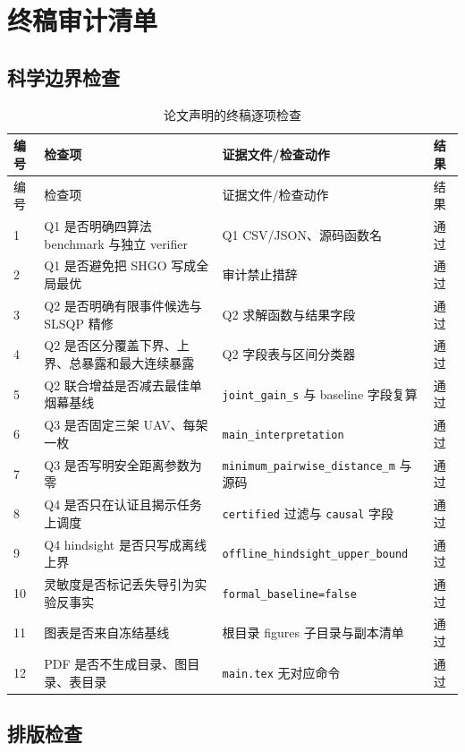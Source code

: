 \section{终稿审计清单}

\subsection{科学边界检查}

\begin{longtable}{p{}p{}p{}p{}}
\caption{论文声明的终稿逐项检查}\label{tab:final-checklist}\\
\toprule
编号 & 检查项 & 证据文件/检查动作 & 结果 \\
\midrule
\endfirsthead
\toprule
编号 & 检查项 & 证据文件/检查动作 & 结果 \\
\midrule
\endhead
1 & Q1 是否明确四算法 benchmark 与独立 verifier & Q1 CSV/JSON、源码函数名 & 通过 \\
2 & Q1 是否避免把 SHGO 写成全局最优 & 审计禁止措辞 & 通过 \\
3 & Q2 是否明确有限事件候选与 SLSQP 精修 & Q2 求解函数与结果字段 & 通过 \\
4 & Q2 是否区分覆盖下界、上界、总暴露和最大连续暴露 & Q2 字段表与区间分类器 & 通过 \\
5 & Q2 联合增益是否减去最佳单烟幕基线 & \texttt{joint\_gain\_s} 与 baseline 字段复算 & 通过 \\
6 & Q3 是否固定三架 UAV、每架一枚 & \texttt{main\_interpretation} & 通过 \\
7 & Q3 是否写明安全距离参数为零 & \texttt{minimum\_pairwise\_distance\_m} 与源码 & 通过 \\
8 & Q4 是否只在认证且揭示任务上调度 & \texttt{certified} 过滤与 \texttt{causal} 字段 & 通过 \\
9 & Q4 hindsight 是否只写成离线上界 & \texttt{offline\_hindsight\_upper\_bound} & 通过 \\
10 & 灵敏度是否标记丢失导引为实验反事实 & \texttt{formal\_baseline=false} & 通过 \\
11 & 图表是否来自冻结基线 & 根目录 figures 子目录与副本清单 & 通过 \\
12 & PDF 是否不生成目录、图目录、表目录 & \texttt{main.tex} 无对应命令 & 通过 \\
\bottomrule
\end{longtable}

\subsection{排版检查}

